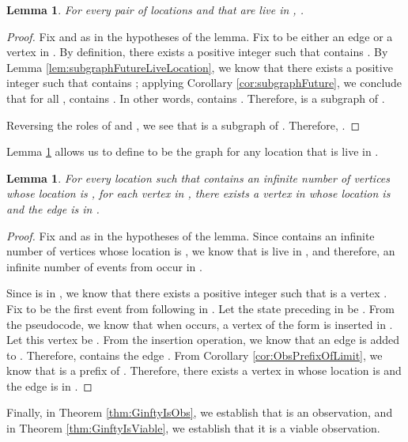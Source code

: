 \documentclass[11pt]{article}
\numberwithin{theorem}{section}
\newtheorem{lemma}[theorem]{Lemma}
\begin{document}
\begin{lemma}
\label{lem:limitGraphs}
For every pair of locations  and  that are live in ,
.
\end{lemma}

\begin{proof}
Fix  and  as in the hypotheses of the lemma. Fix  to be
either an edge or a vertex in . By definition, there
exists a positive integer  such that  contains
. By Lemma \ref{lem:subgraphFutureLiveLocation}, we know that there
exists a positive integer  such that  contains
; applying Corollary \ref{cor:subgraphFuture}, we conclude that for
all ,  contains . In other words,
 contains . Therefore,  is a subgraph of 
.

Reversing the roles of  and , we see that  is a subgraph of
. Therefore, .
\end{proof}

Lemma \ref{lem:limitGraphs} allows us to define  to be the
graph  for any location  that is live in .




\begin{lemma}
\label{lem:GinftyEdges}
For every location  such that  contains an infinite number of
vertices whose location is , for each vertex  in , there exists
a vertex  in  whose location is  and the edge  is in
.
\end{lemma} 

\begin{proof}
Fix  and  as in the hypotheses of the lemma. 
Since  contains an infinite number of vertices whose location is , we know that  is live in , and therefore, an infinite number of events from  occur in .

Since  is in , we know that there exists a positive integer  such that  is a vertex . Fix  to be the first event from  following  in . Let the state preceding  in  be . From the pseudocode, we know that when  occurs, a vertex of the form  is inserted in . Let this vertex be . From the insertion operation, we know that an edge  is added to . Therefore,  contains the edge . From Corollary \ref{cor:ObsPrefixOfLimit}, we know that  is a prefix of . Therefore, there exists
a vertex  in  whose location is  and the edge  is in
.
\end{proof}





 Finally, in Theorem \ref{thm:GinftyIsObs}, we establish that  is an observation, and in Theorem \ref{thm:GinftyIsViable}, we establish that it is a viable observation.
 
\end{document}
